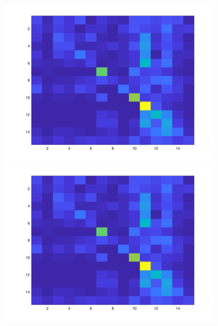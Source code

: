 \documentclass[letter, 11pt]{article}
\begin{document}
\begin{figure}[H]
        \centering
        \includegraphics[width=\textwidth]{HW3/RESULT/ClassifyKNN_Tiny_confusion.png}
    \endminipage\hfill
        \centering
        \includegraphics[width=\textwidth]{HW3/RESULT/ClassifyKNN_Tiny_confusion.png}
    \endminipage\hfill
        \centering

\end{figure}
\end{document}
